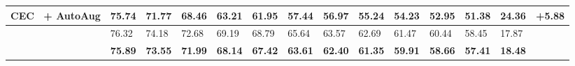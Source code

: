 \begin{table*}[t]
{\begin{tabular}{llllllllllllll}
			CEC~\cite{zhang2021few} + AutoAug                & 75.74   & 71.77    & 68.46   & 63.21   & 61.95    & 57.44 & 56.97 & 55.24    &54.23  &52.95  & 51.38   & 24.36&\bf +5.88   \\
			\midrule
			\mame             &  76.32   &  74.18     & 72.68    & 69.19  & 68.79   &65.64  & 63.57   & 62.69     & 61.47   & 60.44   & 58.45& 17.87 \\
			\name             & \bf 75.89   & \bf 73.55     & \bf71.99    & \bf68.14  & \bf67.42   &\bf63.61  & \bf62.40   &\bf 61.35     & \bf59.91   & \bf58.66   & \bf57.41&\bf 18.48 \\
			
			
			\bottomrule
		\end{tabular}
	}\label{table:cub}
\end{table*}


